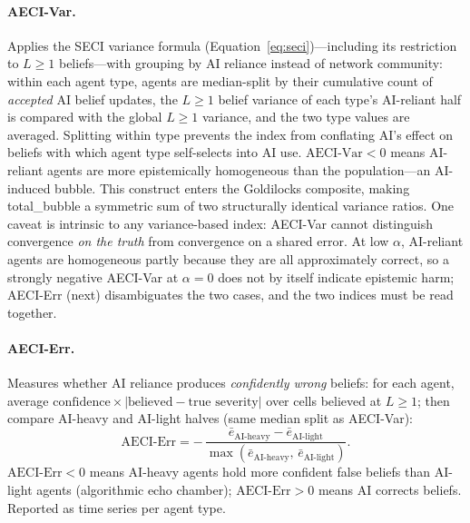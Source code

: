 \paragraph{AECI-Var.}
Applies the SECI variance formula (Equation~\ref{eq:seci})---including its
restriction to $L\geq1$ beliefs---with grouping by AI reliance instead of network
community: within each agent type, agents are median-split by their cumulative
count of \emph{accepted} AI belief updates, the $L\geq1$ belief variance of each
type's AI-reliant half is compared with the global $L\geq1$ variance, and the two
type values are averaged.
Splitting within type prevents the index from conflating AI's effect on beliefs
with which agent type self-selects into AI use.
$\mathrm{AECI\text{-}Var}<0$ means AI-reliant agents are more epistemically
homogeneous than the population---an AI-induced bubble.
This construct enters the Goldilocks composite, making total\_bubble a symmetric
sum of two structurally identical variance ratios.
One caveat is intrinsic to any variance-based index: AECI-Var cannot distinguish
convergence \emph{on the truth} from convergence on a shared error.
At low $\alpha$, AI-reliant agents are homogeneous partly because they are all
approximately correct, so a strongly negative AECI-Var at $\alpha=0$ does not by
itself indicate epistemic harm; AECI-Err (next) disambiguates the two cases, and
the two indices must be read together.

\paragraph{AECI-Err.}
Measures whether AI reliance produces \emph{confidently wrong} beliefs: for each
agent, average $\text{confidence}\times|\text{believed}-\text{true severity}|$
over cells believed at $L\geq1$; then compare AI-heavy and AI-light halves
(same median split as AECI-Var):
%
\begin{equation}
  \mathrm{AECI\text{-}Err}
    = -\,\frac{\bar e_{\mathrm{AI\text{-}heavy}} - \bar e_{\mathrm{AI\text{-}light}}}
              {\max\!\left(\bar e_{\mathrm{AI\text{-}heavy}},\,
                           \bar e_{\mathrm{AI\text{-}light}}\right)}.
  \label{eq:aecierr}
\end{equation}
%
$\mathrm{AECI\text{-}Err}<0$ means AI-heavy agents hold more confident false
beliefs than AI-light agents (algorithmic echo chamber);
$\mathrm{AECI\text{-}Err}>0$ means AI corrects beliefs.
Reported as time series per agent type.

